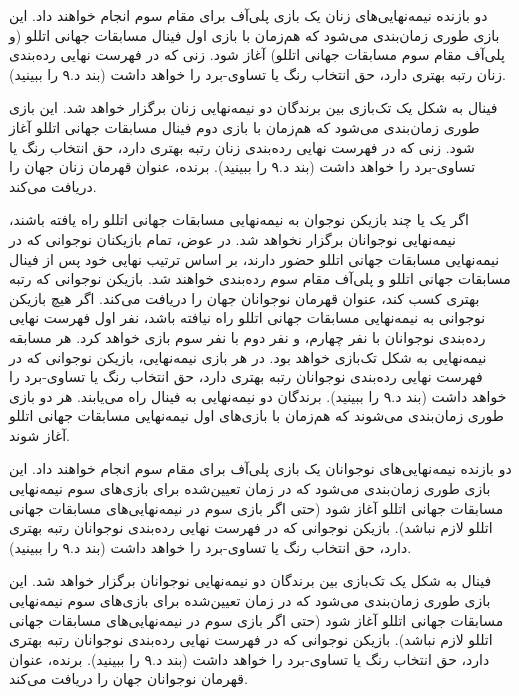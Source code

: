 
دو بازنده نیمه‌نهایی‌های زنان یک بازی پلی‌آف برای مقام سوم انجام خواهند داد. این بازی طوری زمان‌بندی می‌شود که هم‌زمان با بازی اول فینال مسابقات جهانی اتللو (و پلی‌آف مقام سوم مسابقات جهانی اتللو) آغاز شود. زنی که در فهرست نهایی رده‌بندی زنان رتبه بهتری دارد، حق انتخاب رنگ یا تساوی-برد را خواهد داشت (بند د.۹ را ببینید).


فینال به شکل یک تک‌بازی بین برندگان دو نیمه‌نهایی زنان برگزار خواهد شد. این بازی طوری زمان‌بندی می‌شود که هم‌زمان با بازی دوم فینال مسابقات جهانی اتللو آغاز شود. زنی که در فهرست نهایی رده‌بندی زنان رتبه بهتری دارد، حق انتخاب رنگ یا تساوی-برد را خواهد داشت (بند د.۹ را ببینید). برنده، عنوان قهرمان زنان جهان را دریافت می‌کند.



اگر یک یا چند بازیکن نوجوان به نیمه‌نهایی مسابقات جهانی اتللو راه یافته باشند، نیمه‌نهایی نوجوانان برگزار نخواهد شد. در عوض، تمام بازیکنان نوجوانی که در نیمه‌نهایی مسابقات جهانی اتللو حضور دارند، بر اساس ترتیب نهایی خود پس از فینال مسابقات جهانی اتللو و پلی‌آف مقام سوم رده‌بندی خواهند شد. بازیکن نوجوانی که رتبه بهتری کسب کند، عنوان قهرمان نوجوانان جهان را دریافت می‌کند. اگر هیچ بازیکن نوجوانی به نیمه‌نهایی مسابقات جهانی اتللو راه نیافته باشد، نفر اول فهرست نهایی رده‌بندی نوجوانان با نفر چهارم، و نفر دوم با نفر سوم بازی خواهد کرد. هر مسابقه نیمه‌نهایی به شکل تک‌بازی خواهد بود. در هر بازی نیمه‌نهایی، بازیکن نوجوانی که در فهرست نهایی رده‌بندی نوجوانان رتبه بهتری دارد، حق انتخاب رنگ یا تساوی-برد را خواهد داشت (بند د.۹ را ببینید). برندگان دو نیمه‌نهایی به فینال راه می‌یابند. هر دو بازی طوری زمان‌بندی می‌شوند که هم‌زمان با بازی‌های اول نیمه‌نهایی مسابقات جهانی اتللو آغاز شوند.


دو بازنده نیمه‌نهایی‌های نوجوانان یک بازی پلی‌آف برای مقام سوم انجام خواهند داد. این بازی طوری زمان‌بندی می‌شود که در زمان تعیین‌شده برای بازی‌های سوم نیمه‌نهایی مسابقات جهانی اتللو آغاز شود (حتی اگر بازی سوم در نیمه‌نهایی‌های مسابقات جهانی اتللو لازم نباشد). بازیکن نوجوانی که در فهرست نهایی رده‌بندی نوجوانان رتبه بهتری دارد، حق انتخاب رنگ یا تساوی-برد را خواهد داشت (بند د.۹ را ببینید).


فینال به شکل یک تک‌بازی بین برندگان دو نیمه‌نهایی نوجوانان برگزار خواهد شد. این بازی طوری زمان‌بندی می‌شود که در زمان تعیین‌شده برای بازی‌های سوم نیمه‌نهایی مسابقات جهانی اتللو آغاز شود (حتی اگر بازی سوم در نیمه‌نهایی‌های مسابقات جهانی اتللو لازم نباشد). بازیکن نوجوانی که در فهرست نهایی رده‌بندی نوجوانان رتبه بهتری دارد، حق انتخاب رنگ یا تساوی-برد را خواهد داشت (بند د.۹ را ببینید). برنده، عنوان قهرمان نوجوانان جهان را دریافت می‌کند.
